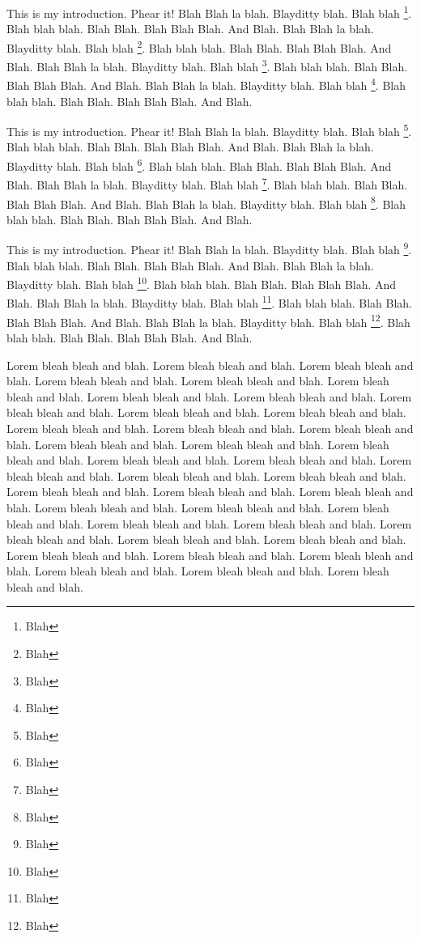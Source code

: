 \documentclass[letterpaper,10pt]{article}
\begin{document}
This is my introduction.  Phear it!  Blah Blah la blah. Blayditty
blah. Blah blah \footnote{Blah}.  Blah blah blah. Blah Blah.  Blah
Blah Blah.  And Blah. Blah Blah la blah. Blayditty
blah. Blah blah \footnote{Blah}.  Blah blah blah. Blah Blah.  Blah
Blah Blah.  And Blah. Blah Blah la blah. Blayditty
blah. Blah blah \footnote{Blah}.  Blah blah blah. Blah Blah.  Blah
Blah Blah.  And Blah. Blah Blah la blah. Blayditty
blah. Blah blah \footnote{Blah}.  Blah blah blah. Blah Blah.  Blah
Blah Blah.  And Blah.

This is my introduction.  Phear it!  Blah Blah la blah. Blayditty
blah. Blah blah \footnote{Blah}.  Blah blah blah. Blah Blah.  Blah
Blah Blah.  And Blah. Blah Blah la blah. Blayditty
blah. Blah blah \footnote{Blah}.  Blah blah blah. Blah Blah.  Blah
Blah Blah.  And Blah. Blah Blah la blah. Blayditty
blah. Blah blah \footnote{Blah}.  Blah blah blah. Blah Blah.  Blah
Blah Blah.  And Blah. Blah Blah la blah. Blayditty
blah. Blah blah \footnote{Blah}.  Blah blah blah. Blah Blah.  Blah
Blah Blah.  And Blah.

This is my introduction.  Phear it!  Blah Blah la blah. Blayditty
blah. Blah blah \footnote{Blah}.  Blah blah blah. Blah Blah.  Blah
Blah Blah.  And Blah. Blah Blah la blah. Blayditty
blah. Blah blah \footnote{Blah}.  Blah blah blah. Blah Blah.  Blah
Blah Blah.  And Blah. Blah Blah la blah. Blayditty
blah. Blah blah \footnote{Blah}.  Blah blah blah. Blah Blah.  Blah
Blah Blah.  And Blah. Blah Blah la blah. Blayditty
blah. Blah blah \footnote{Blah}.  Blah blah blah. Blah Blah.  Blah
Blah Blah.  And Blah.

Lorem bleah bleah and blah. Lorem bleah bleah and blah. Lorem bleah
bleah and blah. Lorem bleah bleah and blah. Lorem bleah bleah and
blah. Lorem bleah bleah and blah. Lorem bleah bleah and blah. Lorem
bleah bleah and blah. Lorem bleah bleah and blah. Lorem bleah bleah
and blah. Lorem bleah bleah and blah. Lorem bleah bleah and blah.
Lorem bleah bleah and blah. Lorem bleah bleah and blah. Lorem bleah
bleah and blah. Lorem bleah bleah and blah. Lorem bleah bleah and
blah. Lorem bleah bleah and blah. Lorem bleah bleah and blah. Lorem
bleah bleah and blah. Lorem bleah bleah and blah. Lorem bleah bleah
and blah. Lorem bleah bleah and blah. Lorem bleah bleah and blah.
Lorem bleah bleah and blah. Lorem bleah bleah and blah. Lorem bleah
bleah and blah. Lorem bleah bleah and blah. Lorem bleah bleah and
blah. Lorem bleah bleah and blah. Lorem bleah bleah and blah. Lorem
bleah bleah and blah. Lorem bleah bleah and blah. Lorem bleah bleah
and blah. Lorem bleah bleah and blah. Lorem bleah bleah and blah.
Lorem bleah bleah and blah. Lorem bleah bleah and blah. Lorem bleah
bleah and blah.
\end{document}
